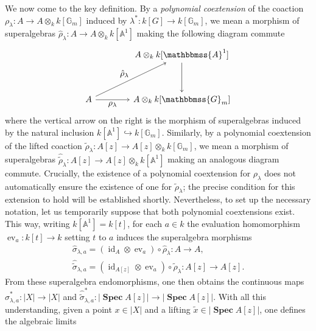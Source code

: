 \documentclass[11pt,a4paper,reqno,noamsfonts]{amsart}
\numberwithin{equation}{section}
\theoremstyle{definition}
\theoremstyle{remark}
\renewcommand{\AA}{\ensuremath{\mathbbmss{A}}}
\newcommand{\GG}{\ensuremath{\mathbbmss{G}}}
\DeclareMathOperator{\id}{id}
\DeclareMathOperator{\ev}{ev}
\DeclareMathOperator{\sSpec}{\mathbf{Spec}}
\begin{document}
We now come to the key definition. By a \emph{polynomial coextension} of the coaction $\rho_{\lambda} \colon A \to A \otimes_k k[\mathbb{G}_m]$ induced by $\lambda^{*} \colon k[G] \to k[\mathbb{G}_m]$, we mean a morphism of superalgebras $\hat{\rho}_{\lambda} \colon A \to A \otimes_k k[\mathbb{A}^{1}]$ making the following diagram commute
\begin{equation}
\begin{tikzcd}[row sep=3.5em,  
column sep=4.0em,
  every label/.append style={font=\normalsize}
]
  & A \otimes_k  k[\AA^{1}]  \arrow[d, -{To[length=2.5pt, width=4pt]}] \\
A \arrow[r, -{To[length=2.5pt, width=4pt]}, "\rho_{\lambda}"'] \arrow[ru, -{To[length=2.5pt, width=4pt]}, "\hat{\rho}_{\lambda}"]& A \otimes_k  k[\GG_m] 
\end{tikzcd}
\end{equation}
where the vertical arrow on the right is the morphism of superalgebras induced by the natural inclusion $k[\mathbb{A}^{1}] \hookrightarrow k[\mathbb{G}_m]$. Similarly, by a polynomial coextension of the lifted coaction $\tilde{\rho}_{\lambda} \colon A[z] \to A[z] \otimes_k k[\mathbb{G}_m]$, we mean a morphism of superalgebras $\hat{\tilde{\rho}}_{\lambda} \colon A[z] \to A[z] \otimes_k k[\mathbb{A}^{1}]$ making an analogous diagram commute. Crucially, the existence of a polynomial coextension for $\rho_{\lambda}$ does not automatically ensure the existence of one for $\tilde{\rho}_{\lambda}$; the precise condition for this extension to hold will be established shortly. Nevertheless, to set up the necessary notation, let us temporarily suppose that both polynomial coextensions exist. This way, writing $k[\mathbb{A}^1] = k[t]$, for each $a \in k$ the evaluation homomorphism $\ev_a \colon k[t] \to k$ setting $t$ to $a$ induces the superalgebra morphisms
\begin{equation}\label{eq:4.14}
\begin{gathered}
    \hat{\sigma}_{\lambda,a} = (\id_{A} \otimes \ev_a) \circ \hat{\rho}_{\lambda} \colon A \to A, \\
    \hat{\tilde{\sigma}}_{\lambda,a} = (\id_{A[z]} \otimes \ev_a) \circ \hat{\tilde{\rho}}_{\lambda} \colon A[z] \to A[z]. 
\end{gathered}
\end{equation}
From these superalgebra endomorphisms, one then obtains the continuous maps $\hat{\sigma}_{\lambda,a}^*\colon \lvert X \rvert \to \lvert X \rvert$ and $\hat{\tilde{\sigma}}_{\lambda,a}^* \colon \lvert \sSpec A[z] \rvert \to \lvert \sSpec A[z] \rvert$. With all this understanding, given a point $x \in \lvert X \rvert$ and a lifting $\tilde{x} \in \lvert \sSpec A[z] \rvert$, one defines the algebraic limits
\end{document}
